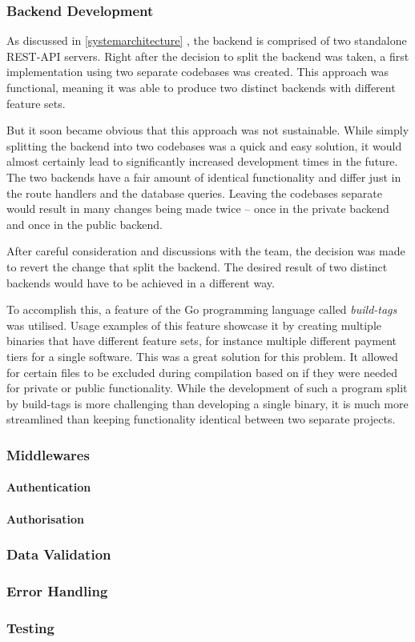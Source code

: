 \subsubsection{Backend Development}
As discussed in \ref{systemarchitecture} , the
backend is comprised of two standalone REST-API servers. Right after the
decision to split the backend was taken, a first implementation using two
separate codebases was created. This approach was functional, meaning it was
able to produce two distinct backends with different feature sets.

But it soon became obvious that this approach was not sustainable. While simply
splitting the backend into two codebases was a quick and easy solution, it would
almost certainly lead to significantly increased development times in the
future. The two backends have a fair amount of identical functionality and
differ just in the route handlers and the database queries. Leaving the
codebases separate would result in many changes being made twice -- once in the
private backend and once in the public backend.

After careful consideration and discussions with the team, the decision was made
to revert the change that split the backend. The desired result of two distinct
backends would have to be achieved in a different way.

To accomplish this, a feature of the Go programming language called
\textit{build-tags} was utilised. Usage examples of this feature showcase it by
creating multiple binaries that have different feature sets, for instance
multiple different payment tiers for a single software. This was a great
solution for this problem. It allowed for certain files to be excluded during
compilation based on if they were needed for private or public functionality.
While the development of such a program split by build-tags is more challenging
than developing a single binary, it is much more streamlined than keeping
functionality identical between two separate projects.

\subsubsection{Middlewares}
\paragraph{Authentication}
\paragraph{Authorisation}
\subsubsection{Data Validation}
\subsubsection{Error Handling}
\subsubsection{Testing}